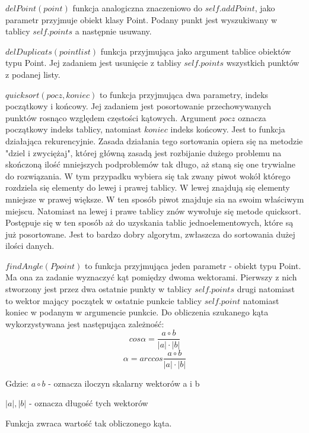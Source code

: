 $delPoint(point)$ funkcja analogiczna znaczeniowo do $self.addPoint$, jako parametr przyjmuje obiekt klasy Point. Podany punkt jest wyszukiwany w tablicy $self.points$ a następnie usuwany.

$delDuplicats(pointlist)$ funkcja przyjmująca jako argument tablice obiektów typu Point. Jej zadaniem jest usunięcie z tablisy $self.points$ wszystkich punktów z podanej listy.

$quicksort(pocz,koniec)$ to funkcja przyjmująca dwa parametry, indeks początkowy i końcowy. Jej zadaniem jest posortowanie przechowywanych punktów rosnąco względem częstości kątowych. Argument $pocz$ oznacza początkowy indeks tablicy, natomiast $koniec$ indeks końcowy. Jest to funkcja działająca rekurencyjnie. Zasada działania tego sortowania opiera się na metodzie "dziel i zwyciężaj", której główną zasadą jest rozbijanie dużego problemu na skończoną ilość mniejszych podproblemów tak długo, aż staną się one trywialne do rozwiązania. W tym przypadku wybiera się tak zwany piwot wokół którego rozdziela się elementy do lewej i prawej tablicy. W lewej znajdują się elementy mniejsze w prawej większe. W ten sposób piwot znajduje sia na swoim właściwym miejscu. Natomiast na lewej i prawe tablicy znów wywołuje się metode quicksort. Postępuje się w ten sposób aż do uzyskania tablic jednoelementowych, które są już posortowane. Jest to bardzo dobry algorytm, zwłaszcza do sortowania dużej ilości danych.

$findAngle(Ppoint)$ to funkcja przyjmująca jeden parametr - obiekt typu Point. Ma ona za zadanie wyznaczyć kąt pomiędzy dwoma wektorami. Pierwszy z nich stworzony jest przez dwa ostatnie punkty w tablicy $self.points$ drugi natomiast to wektor mający początek w ostatnie punkcie tablicy $self.point$ natomiast koniec w podanym w argumencie punkcie. Do obliczenia szukanego kąta wykorzystywana jest następująca zależność:
\begin{equation}
cos \alpha = \frac{a \circ b}{|a|\cdot |b|}
\end{equation}
\begin{equation}
\alpha = arccos \frac{a \circ b}{|a|\cdot |b|}
\end{equation}

Gdzie:
$a \circ b$ - oznacza iloczyn skalarny wektorów a i b

$|a|,|b|$ - oznacza długość tych wektorów

Funkcja zwraca wartość tak obliczonego kąta.


